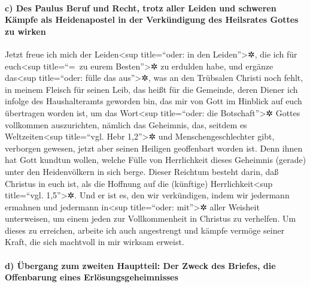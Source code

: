 \hypertarget{c-des-paulus-beruf-und-recht-trotz-aller-leiden-und-schweren-kuxe4mpfe-als-heidenapostel-in-der-verkuxfcndigung-des-heilsrates-gottes-zu-wirken}{%
\paragraph{c) Des Paulus Beruf und Recht, trotz aller Leiden und
schweren Kämpfe als Heidenapostel in der Verkündigung des Heilsrates
Gottes zu
wirken}\label{c-des-paulus-beruf-und-recht-trotz-aller-leiden-und-schweren-kuxe4mpfe-als-heidenapostel-in-der-verkuxfcndigung-des-heilsrates-gottes-zu-wirken}}

 Jetzt freue ich mich der Leiden\textless sup
title=``oder: in den Leiden''\textgreater✲, die ich für
euch\textless sup title=``=~zu eurem Besten''\textgreater✲ zu erdulden
habe, und ergänze das\textless sup title=``oder: fülle das
aus''\textgreater✲, was an den Trübsalen Christi noch fehlt, in meinem
Fleisch für seinen Leib, das heißt für die Gemeinde, 
deren Diener ich infolge des Haushalteramts geworden bin, das mir von
Gott im Hinblick auf euch übertragen worden ist, um das
Wort\textless sup title=``oder: die Botschaft''\textgreater✲ Gottes
vollkommen auszurichten,  nämlich das Geheimnis, das,
seitdem es Weltzeiten\textless sup title=``vgl. Hebr 1,2''\textgreater✲
und Menschengeschlechter gibt, verborgen gewesen, jetzt aber seinen
Heiligen geoffenbart worden ist.  Denn ihnen hat Gott
kundtun wollen, welche Fülle von Herrlichkeit dieses Geheimnis (gerade)
unter den Heidenvölkern in sich berge. Dieser Reichtum besteht darin,
daß Christus in euch ist, als die Hoffnung auf die (künftige)
Herrlichkeit\textless sup title=``vgl. 1,5''\textgreater✲.
 Und er ist es, den wir verkündigen, indem wir jedermann
ermahnen und jedermann in\textless sup title=``oder: mit''\textgreater✲
aller Weisheit unterweisen, um einem jeden zur Vollkommenheit in
Christus zu verhelfen.  Um dieses zu erreichen, arbeite
ich auch angestrengt und kämpfe vermöge seiner Kraft, die sich machtvoll
in mir wirksam erweist.

\hypertarget{d-uxfcbergang-zum-zweiten-hauptteil-der-zweck-des-briefes-die-offenbarung-eines-erluxf6sungsgeheimnisses}{%
\paragraph{d) Übergang zum zweiten Hauptteil: Der Zweck des Briefes, die
Offenbarung eines
Erlösungsgeheimnisses}\label{d-uxfcbergang-zum-zweiten-hauptteil-der-zweck-des-briefes-die-offenbarung-eines-erluxf6sungsgeheimnisses}}

